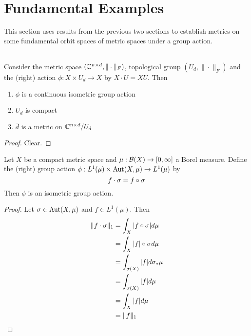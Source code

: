 \documentclass{book}
\begin{document}
	
	
	
	
	
	
	
	
	
	

	
	
	
	
	
	
	
	
	
	
	\newpage
	\section{Fundamental Examples}
	\begin{note}
	This section uses results from the previous two sections to establish metrics on some fundamental orbit spaces of metric spaces under a group action. 
	\end{note} 
		
	
	\begin{ex} \lex{}  \\
	Consider the metric space $(\mathbb{C}^{n \times d}, \|\cdot\|_F)$, topological group $(U_d, \|\cdot\|_F)$ and  the (right) action $\phi: X \times U_d \rightarrow X$ by $X \cdot U = XU$. Then 
	\begin{enumerate}
	\item $\phi$ is a continuous isometric group action 
	\item $U_d$ is compact 
	\item $\bar{d}$ is a metric on $\mathbb{C}^{n \times d}/ U_d$
	\end{enumerate}
	\end{ex}
	
	\begin{proof}
	Clear.
	\end{proof}		
	
	\begin{ex} \lex{}
	Let $X$ be a compact metric space and $\mu:\mathcal{B}(X) \rightarrow [0,\infty]$ a Borel measure. Define the (right) group action $\phi: L^1(\mu) \times \operatorname{Aut}(X, \mu) \rightarrow L^1(\mu) $ by $$f \cdot \sigma = f \circ \sigma$$ Then $\phi$ is an isometric group action. 
	\end{ex}
	
	\begin{proof}
	Let $\sigma \in \operatorname{Aut}(X, \mu)$ and $f \in L^1(\mu)$. 
Then 
	\begin{align*}
	\|f \cdot \sigma\|_1
	&=  \int_X |f \circ \sigma| d\mu \\
	&=  \int_X |f| \circ \sigma d\mu \\
	&=  \int_{\sigma(X)} |f| d \sigma_* \mu  \\
	&=  \int_{\sigma(X)} |f| d \mu \\
	&=  \int_{X} |f| d \mu \\
	&= \|f\|_1 
	\end{align*}	 
	\end{proof}
	
\end{document}
